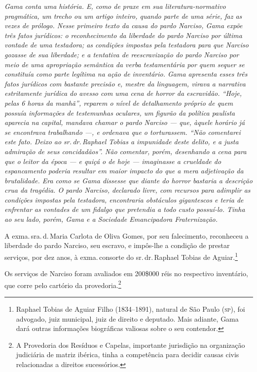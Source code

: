 \begin{didascalia}
\emph{Gama conta uma história. E, como de praxe em sua
literatura-normativo pragmática, um trecho ou um artigo inteiro, quando
parte de uma série, faz as vezes de prólogo. Nesse primeiro texto da
causa do pardo Narciso, Gama expõe três fatos jurídicos: o
reconhecimento da liberdade do pardo Narciso por última vontade de uma
testadora; as condições impostas pela testadora para que Narciso gozasse
de sua liberdade; e a tentativa de reescravização do pardo Narciso por
meio de uma apropriação semântica da verba testamentária por quem sequer
se constituía como parte legítima na ação de inventário. Gama apresenta
esses três fatos jurídicos com bastante precisão e, mestre da linguagem,
virava a narrativa estritamente jurídica do avesso com uma cena de
horror da escravidão. ``Hoje, pelas 6 horas da manhã'', reparem o nível de
detalhamento próprio de quem possuía informações de testemunhas
oculares, um figurão da política paulista aparecia na capital, mandava
chamar o pardo Narciso --- que, àquele horário já se encontrava
trabalhando ---, e ordenava que o torturassem. ``Não comentarei este fato.
Deixo ao sr.\,dr.\,Raphael Tobias a impunidade deste delito, e a justa
admiração de seus concidadãos''. Não comentar, porém, desenhando a cena
para que o leitor da época --- e quiçá o de hoje --- imaginasse a crueldade
do espancamento poderia resultar em maior impacto do que a mera
adjetivação da brutalidade. Era como se Gama dissesse que diante do
horror bastaria a descrição crua da tragédia. O pardo Narciso, declarado
livre, com recursos para adimplir as condições impostas pela testadora,
encontraria obstáculos gigantescos e teria de enfrentar as vontades de
um fidalgo que pretendia a todo custo possuí-lo. Tinha ao seu lado,
porém, Gama e a Sociedade Emancipadora Fraternização.}
\end{didascalia}


A exma.\,sra.\,d.\,Maria Carlota de Oliva Gomes, por seu falecimento,
reconheceu a liberdade do pardo Narciso, seu escravo, e impôs-lhe a
condição de prestar serviços, por dez anos, à exma.\,consorte do sr.\,dr.\,Raphael Tobias de Aguiar.\footnote{ Raphael Tobias de Aguiar Filho
  (1834--1891), natural de São Paulo (\textsc{sp}), foi advogado, juiz municipal,
  juiz de direito e deputado. Mais adiante, Gama dará outras informações
  biográficas valiosas sobre o seu contendor.}

Os serviços de Narciso foram avaliados em 200\$000 réis no respectivo
inventário, que corre pelo cartório da
provedoria.\footnote{ A Provedoria dos Resíduos e
  Capelas, importante jurisdição na organização judiciária de matriz
  ibérica, tinha a competência para decidir causas civis relacionadas a
  direitos sucessórios.}

